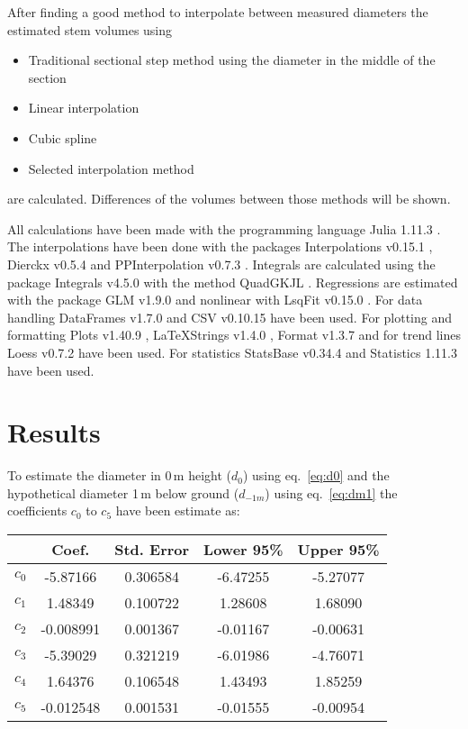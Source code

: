 \documentclass[twocolumn]{scrartcl}
\begin{document}
After finding a good method to interpolate between measured diameters the
estimated stem volumes using
\begin{itemize}[nolistsep]
  \item Traditional sectional step method using the diameter in the middle of the section
  \item Linear interpolation
  \item Cubic spline
  \item Selected interpolation method
\end{itemize}
are calculated. Differences of the volumes between those methods will be shown.

All calculations have been made with the programming language Julia 1.11.3
\citep{Julia-2017}. The interpolations have been done with the packages
Interpolations v0.15.1 \citep{juliaMathInterpolations}, Dierckx v0.5.4
\citep{juliaDierckx} and PPInterpolation v0.7.3 \citep{juliaPPInterpolation}.
Integrals are calculated using the package Integrals v4.5.0
\citep{juliaIntegrals} with the method QuadGKJL \citep{laurie1997calculation}.
Regressions are estimated with the package GLM v1.9.0 \citep{juliaGLM} and
nonlinear with LsqFit v0.15.0 \citep{juliaLsqFit}. For data handling DataFrames
v1.7.0 \citep{juliaDataframes} and CSV v0.10.15 \citep{juliaCsv} have been used.
For plotting and formatting Plots v1.40.9 \citep{juliaPlots}, LaTeXStrings
v1.4.0 \citep{juliaLaTeXStrings}, Format v1.3.7 \citep{juliaFormat} and for
trend lines Loess v0.7.2 \citep{juliaLoess} have been used. For statistics
StatsBase v0.34.4 \citep{juliaStatsBase} and Statistics 1.11.3
\citep{Julia-2017} have been used.


\section{Results}

To estimate the diameter in 0\,m height ($d_0$) using eq.~\ref{eq:d0} and the
hypothetical diameter 1\,m below ground ($d_{-1m}$) using eq.~\ref{eq:dm1} the
coefficients $c_0$ to $c_5$ have been estimate as:

\begin{tabular}{l S[table-format=2.6] S[table-format=1.6] S[table-format=2.6] S[table-format=2.6]}
      & {Coef.} &{Std. Error}  &  {Lower 95\%} &   {Upper 95\%}\\
\hline
$c_0$ & -5.87166  & 0.306584 & -6.47255 & -5.27077 \\
$c_1$ &  1.48349  & 0.100722 &  1.28608 &  1.68090 \\
$c_2$ & -0.008991 & 0.001367 & -0.01167 & -0.00631 \\[.4em]
$c_3$ & -5.39029  & 0.321219 & -6.01986 & -4.76071 \\
$c_4$ &  1.64376  & 0.106548 &  1.43493 &  1.85259 \\
$c_5$ & -0.012548 & 0.001531 & -0.01555 & -0.00954
\end{tabular}
\end{document}
